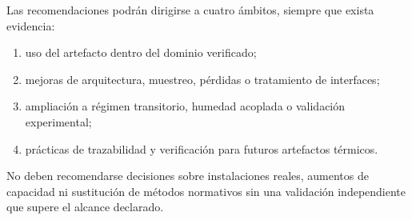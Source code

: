 
Las recomendaciones podrán dirigirse a cuatro ámbitos, siempre que exista evidencia:

\begin{enumerate}
  \item uso del artefacto dentro del dominio verificado;
  \item mejoras de arquitectura, muestreo, pérdidas o tratamiento de interfaces;
  \item ampliación a régimen transitorio, humedad acoplada o validación experimental;
  \item prácticas de trazabilidad y verificación para futuros artefactos térmicos.
\end{enumerate}

No deben recomendarse decisiones sobre instalaciones reales, aumentos de capacidad ni sustitución de métodos normativos sin una validación independiente que supere el alcance declarado.

